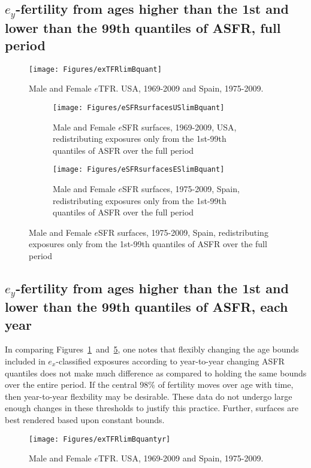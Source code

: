  \FloatBarrier
\subsection{$e_y$-fertility from ages higher than the 1st and lower than the
99th quantiles of ASFR, full period}

\begin{figure}[ht!]
        \centering  
          \caption{Male and Female $e$TFR. USA, 1969-2009 and Spain, 1975-2009.}
           \texttt{[image: Figures/exTFRlimBquant]}
          \label{fig:exTFRlimBquant}
\end{figure}

\label{sec:quant}
\begin{figure}[ht!]
        \centering
        \begin{subfigure}
                \centering
                \caption{Male and Female $e$SFR surfaces, 1969-2009, USA,
                redistributing exposures only from the 1st-99th quantiles of
                ASFR over the full period}
                \texttt{[image: Figures/eSFRsurfacesUSlimBquant]}
                \label{fig:exSFRsurfUSlimBquant}
        \end{subfigure}
        \begin{subfigure}
                \centering
                \caption{Male and Female $e$SFR surfaces, 1975-2009, Spain,
                redistributing exposures only from the 1st-99th quantiles of
                ASFR over the full period}
                \texttt{[image: Figures/eSFRsurfacesESlimBquant]} 
                \label{fig:exSFRsurfESlimBquant}
        \end{subfigure}
\end{figure}

 \FloatBarrier
\subsection{$e_y$-fertility from ages higher than the 1st and lower than the
99th quantiles of ASFR, each year}
\label{sec:quantan}
In comparing Figures~\ref{fig:exTFRlimBquant}~and~\ref{fig:exTFRlimBquantyr},
one notes that flexibly changing the age bounds included in $e_x$-classified
exposures according to year-to-year changing ASFR quantiles does not make much
difference as compared to holding the same bounds over the entire period. If
the central 98\% of fertility moves over age with time, then year-to-year
flexbility may be desirable. These data do not undergo large enough changes in
these thresholds to justify this practice. Further, surfaces are best rendered
based upon constant bounds.

 \begin{figure}[ht!]
        \centering  
          \caption{Male and Female $e$TFR. USA, 1969-2009 and Spain, 1975-2009.}
           \texttt{[image: Figures/exTFRlimBquantyr]}
          \label{fig:exTFRlimBquantyr}
\end{figure}
